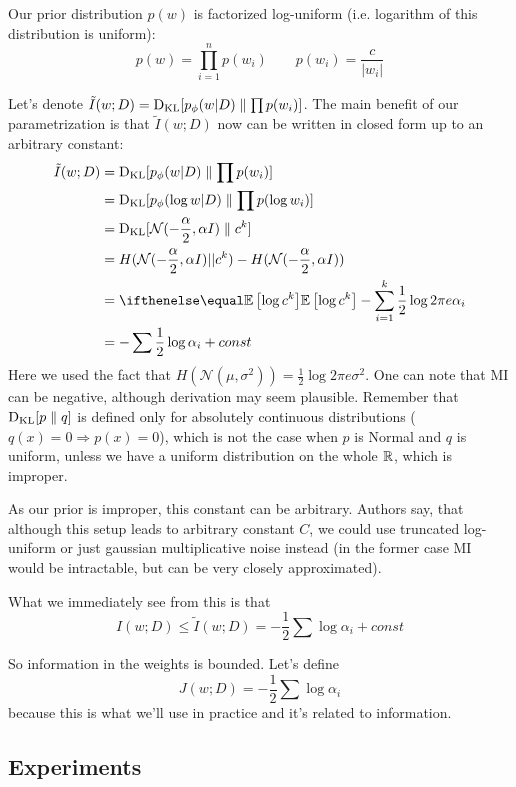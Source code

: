 \documentclass{article}
\begin{document}
Our prior distribution $p(w)$ is factorized log-uniform (i.e. logarithm of this distribution is uniform):
\[
p(w) = \prod_{i=1}^n p(w_i) \qquad p(w_i) = \frac{c}{|w_i|}
\]

Let's denote $\tilde I(w;D) = \text{D}_\text{KL}[p_\phi(w|D) \parallel \prod p(w_i)]$.
The main benefit of our parametrization is that $\tilde I(w;D)$ now can be written in closed form up to an arbitrary constant:
\begin{equation}\label{eq:computable-mi}
\begin{split}
\tilde I(w;D) &= \kl{p_\phi(w|D)}{\prod p(w_i)}
\\
&= \kl{p_\phi(\log w|D)}{\prod p(\log w_i)}
\\
&= \kl{\mathcal{N}(-\frac{\alpha}{2}, \alpha I)}{c^k}
\\
&= H(\mathcal{N}(-\frac{\alpha}{2}, \alpha I) || c^k) - H(\mathcal{N}(-\frac{\alpha}{2}, \alpha I))
\\
&= \expect{\log c^k} - \sum_{i=1}^k \frac{1}{2}\log 2\pi e \alpha_i
\\
&= -\sum \frac{1}{2}\log \alpha_i + const
\end{split}
\end{equation}
Here we used the fact that $H(\mathcal{N}(\mu, \sigma^2)) = \frac{1}{2}\log 2\pi e \sigma^2$.
One can note that MI can be negative, although derivation may seem plausible.
Remember that $\text{D}_\text{KL}[p \parallel q]$ is defined only for absolutely continuous distributions ($q(x) = 0 \Rightarrow p(x) = 0$), which is not the case when $p$ is Normal and $q$ is uniform, unless we have a uniform distribution on the whole $\mathbb{R}$, which is improper.

As our prior is improper, this constant can be arbitrary.
Authors say, that although this setup leads to arbitrary constant $C$, we could use truncated log-uniform or just gaussian multiplicative noise instead (in the former case MI would be intractable, but can be very closely approximated).

What we immediately see from this is that
\[
I(w;D) \leq \tilde I(w;D) = -\frac{1}{2}\sum \log \alpha_i + const
\]

So information in the weights is bounded.
Let's define
\[
J(w;D) = -\frac{1}{2}\sum \log \alpha_i
\]
because this is what we'll use in practice and it's related to information.

\subsection*{Experiments}
\end{document}

